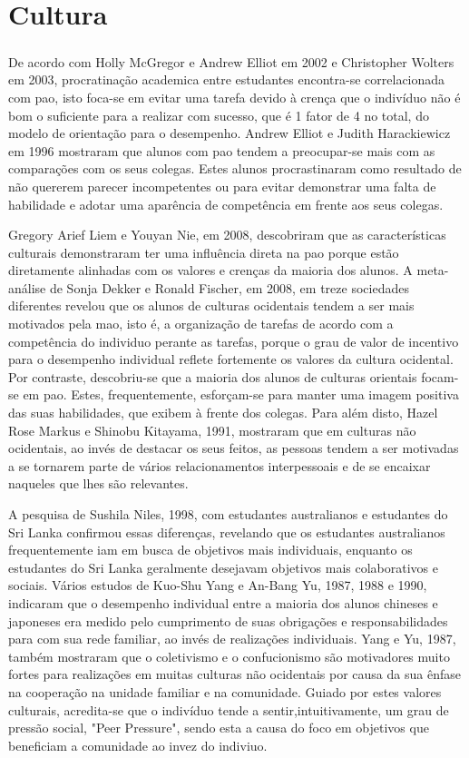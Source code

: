\documentclass{report}
\begin{document}
\chapter{Cultura}
\label{chap.cultura}
\paragraph{}
De acordo com Holly McGregor e Andrew Elliot em 2002 e Christopher Wolters em 2003, procratinação academica entre estudantes encontra-se correlacionada com \ac{pao}, isto foca-se em evitar uma tarefa devido à crença que o indivíduo não é bom o suficiente para a realizar com sucesso, que é 1 fator de 4 no total, do modelo de orientação para o desempenho. Andrew Elliot e Judith Harackiewicz em 1996 mostraram que alunos com \ac{pao} tendem a preocupar-se mais com as comparações com os seus colegas. Estes alunos procrastinaram como resultado de não quererem parecer incompetentes ou para evitar demonstrar uma falta de habilidade e adotar uma aparência de competência em frente aos seus colegas.

Gregory Arief Liem e Youyan Nie, em 2008, descobriram que as características culturais demonstraram ter uma influência direta na \ac{pao} porque estão diretamente alinhadas com os valores e crenças da maioria dos alunos. A meta-análise de Sonja Dekker e Ronald Fischer, em 2008, em treze sociedades diferentes revelou que os alunos de culturas ocidentais tendem a ser mais motivados pela \ac{mao}, isto é, a organização de tarefas de acordo com a competência do individuo perante as tarefas, porque o grau de valor de incentivo para o desempenho individual reflete fortemente os valores da cultura ocidental. Por contraste, descobriu-se que a maioria dos alunos de culturas orientais focam-se em \ac{pao}. Estes, frequentemente, esforçam-se para manter uma imagem positiva das suas habilidades, que exibem à frente dos colegas. Para além disto, Hazel Rose Markus e Shinobu Kitayama, 1991, mostraram que em culturas não ocidentais, ao invés de destacar os seus feitos, as pessoas tendem a ser motivadas a se tornarem parte de vários relacionamentos interpessoais e de se encaixar naqueles que lhes são relevantes.

A pesquisa de Sushila Niles, 1998, com estudantes australianos e estudantes do Sri Lanka confirmou essas diferenças, revelando que os estudantes australianos frequentemente iam em busca de objetivos mais individuais, enquanto os estudantes do Sri Lanka geralmente desejavam objetivos mais colaborativos e sociais. Vários estudos de Kuo-Shu Yang e An-Bang Yu, 1987, 1988 e 1990, indicaram que o desempenho individual entre a maioria dos alunos chineses e japoneses era medido pelo cumprimento de suas obrigações e responsabilidades para com sua rede familiar, ao invés de realizações individuais. Yang e Yu, 1987, também mostraram que o coletivismo e o confucionismo são motivadores muito fortes para realizações em muitas culturas não ocidentais por causa da sua ênfase na cooperação na unidade familiar e na comunidade. Guiado por estes valores culturais, acredita-se que o indivíduo tende a sentir,intuitivamente, um grau de pressão social, "Peer Pressure", sendo esta a causa do foco em objetivos que beneficiam a comunidade ao invez do indiviuo.
\end{document}
